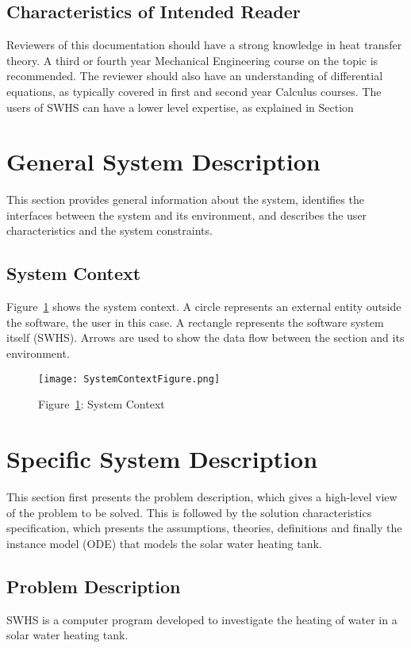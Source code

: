 \documentclass[12pt]{article}
\begin{document}
\subsection{Characteristics of Intended Reader}
\label{Sec:CharofInteRead}
Reviewers of this documentation should have a strong knowledge in heat transfer theory. A third or fourth year Mechanical Engineering course on the topic is recommended. The reviewer should also have an understanding of differential equations, as typically covered in first and second year Calculus courses. The users of SWHS can have a lower level expertise, as explained in Section
\section{General System Description}
\label{Sec:GeneSystDesc}
This section provides general information about the system, identifies the interfaces between the system and its environment, and describes the user characteristics and the system constraints.
\subsection{System Context}
\label{Sec:SystCont}
Figure~\ref{Figure::SystCont} shows the system context. A circle represents an external entity outside the software, the user in this case. A rectangle represents the software system itself (SWHS). Arrows are used to show the data flow between the section and its environment.
\begin{figure}
\begin{center}
\texttt{[image: SystemContextFigure.png]}
\caption{Figure~\ref{Figure::SystCont}: System Context}
\label{Figure::SystCont}
\end{center}
\end{figure}
\section{Specific System Description}
\label{Sec:SpecSystDesc}
This section first presents the problem description, which gives a high-level view of the problem to be solved. This is followed by the solution characteristics specification, which presents the assumptions, theories, definitions and finally the instance model (ODE) that models the solar water heating tank.
\subsection{Problem Description}
\label{Sec:ProbDesc}
SWHS is a computer program developed to investigate the heating of water in a solar water heating tank.
\end{document}
